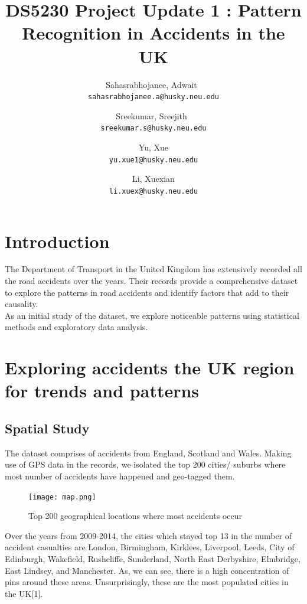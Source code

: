 \documentclass[a4paper, 10pt]{article}
\begin{document}
\title{DS5230 Project Update 1 : Pattern Recognition in Accidents in the UK}


\author{
  Sahasrabhojanee, Adwait\ \\     \texttt{sahasrabhojanee.a@husky.neu.edu}
  \and
  Sreekumar, Sreejith\  \\ \texttt{sreekumar.s@husky.neu.edu}
  \and
  Yu, Xue \\  \texttt{yu.xue1@husky.neu.edu}
  \and
  Li, Xuexian  \\ \texttt{li.xuex@husky.neu.edu}
}
\maketitle
\section{Introduction}
The Department of Transport in the United Kingdom has extensively recorded all the road accidents over the years. Their records provide a comprehensive dataset to
explore the patterns in road accidents and identify factors that add to their causality. \\
  As an initial study of the dataset, we explore noticeable patterns using statistical methods and exploratory data analysis. 

\section{Exploring accidents the UK region for trends and patterns }

\subsection{Spatial Study}  
The dataset comprises of accidents from England, Scotland and Wales. Making use of GPS data in the records, we isolated the top 200 cities/ suburbs where most number of
accidents have happened and geo-tagged them. \\

\begin{figure}[H]
    \begin{center}
      \texttt{[image: map.png]}
      \caption{Top 200 geographical locations where most accidents occur}
    \end{center}
\end{figure}

    Over the years from 2009-2014, the cities which stayed top 13 in the number of accident casualties are London, Birmingham, Kirklees, Liverpool, Leeds, City of Edinburgh, Wakefield, Rushcliffe, Sunderland, North East Derbyshire, Elmbridge, East Lindsey, and Manchester. As, we can see, there is a high concentration of pins around these areas. Unsurprisingly, these are the most populated cities in the UK[1]. \\
\end{document}
